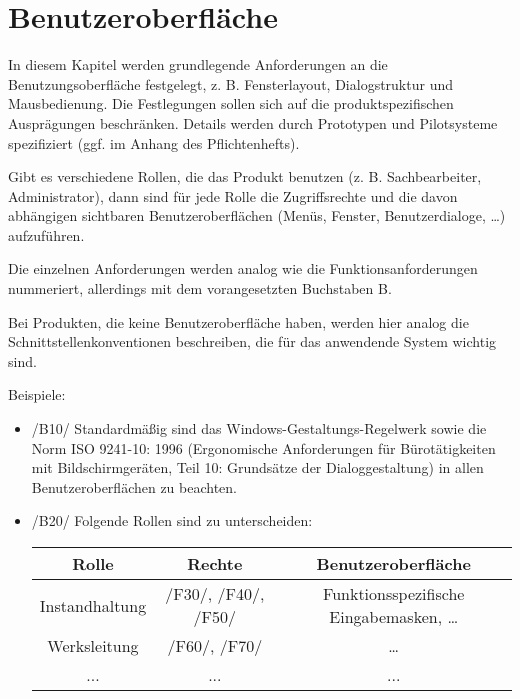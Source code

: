 

\chapter{Benutzeroberfläche}
In diesem Kapitel werden grundlegende Anforderungen an die Benutzungsoberfläche
festgelegt, z. B. Fensterlayout, Dialogstruktur und Mausbedienung. Die
Festlegungen sollen sich auf die produktspezifischen Ausprägungen beschränken.
Details werden durch Prototypen und Pilotsysteme spezifiziert (ggf. im Anhang
des Pflichtenhefts).

Gibt es verschiedene Rollen, die das Produkt benutzen (z. B. Sachbearbeiter,
Administrator), dann sind für jede Rolle die Zugriffsrechte und die davon
abhängigen sichtbaren Benutzeroberflächen (Menüs, Fenster, Benutzerdialoge,
\ldots) aufzuführen.

Die einzelnen Anforderungen werden analog wie die Funktionsanforderungen
nummeriert, allerdings mit dem vorangesetzten Buchstaben B.

Bei Produkten, die keine Benutzeroberfläche haben, werden hier analog die
Schnittstellenkonventionen beschreiben, die für das anwendende System wichtig
sind.

Beispiele:
\begin{itemize}
\item /B10/
Standardmäßig sind das Windows-Gestaltungs-Regelwerk sowie die Norm ISO
9241-10: 1996 (Ergonomische Anforderungen für Bürotätigkeiten mit
Bildschirmgeräten, Teil 10: Grundsätze der Dialoggestaltung) in allen
Benutzeroberflächen zu beachten.

\item /B20/ Folgende Rollen sind zu unterscheiden: \\
\begin{tabular}{|c|c|c|}
  \hline
  Rolle &  Rechte & Benutzeroberfläche\\
  \hline
  Instandhaltung &  /F30/, /F40/, /F50/  & Funktionsspezifische Eingabemasken,
                                                                        \ldots\\
  \hline
  Werksleitung & /F60/, /F70/  & \ldots\\
  \hline
  ...&...&...\\
  \hline
  \end{tabular}

\end{itemize}
